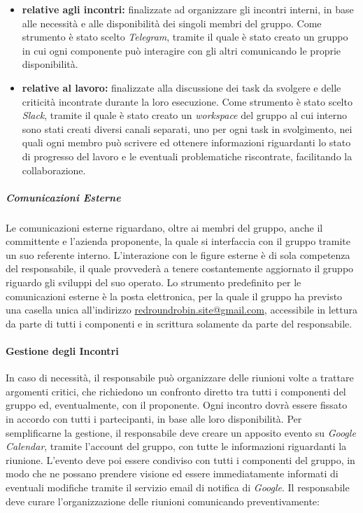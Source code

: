 				\begin{itemize}
					\item \textbf{relative agli incontri:} finalizzate ad organizzare gli incontri interni, in base alle necessità e alle disponibilità dei singoli membri del gruppo.
					\newline
					Come strumento è stato scelto \textit{Telegram}, tramite il quale è stato creato un gruppo in cui ogni componente può interagire con gli altri comunicando le proprie disponibilità.
					\item \textbf{relative al lavoro:} finalizzate alla discussione dei task da svolgere e delle criticità incontrate durante la loro esecuzione.
					\newline
					Come strumento è stato scelto \textit{Slack}, tramite il quale è stato creato un \textit{workspace} del gruppo al cui interno sono stati creati diversi canali separati, uno per ogni task in svolgimento, nei quali ogni membro può scrivere ed ottenere informazioni riguardanti lo stato di progresso del lavoro e le eventuali problematiche riscontrate, facilitando la collaborazione. 
				\end{itemize}
			
			\subparagraph{Comunicazioni Esterne}
			
				Le comunicazioni esterne riguardano, oltre ai membri del gruppo, anche il committente e l'azienda proponente, la quale si interfaccia con il gruppo tramite un suo referente interno. L'interazione con le figure esterne è di sola competenza del responsabile, il quale provvederà a tenere costantemente aggiornato il gruppo riguardo gli sviluppi del suo operato.
				\newline
				Lo strumento predefinito per le comunicazioni esterne è la posta elettronica, per la quale il gruppo ha previsto una casella unica all'indirizzo \href{mailto:redroundrobin.site@gmail.com}{redroundrobin.site@gmail.com}, accessibile in lettura da parte di tutti i componenti e in scrittura solamente da parte del responsabile.
						
		\paragraph{Gestione degli Incontri}
		
			In caso di necessità, il responsabile può organizzare delle riunioni volte a trattare argomenti critici, che richiedono un confronto diretto tra tutti i componenti del gruppo ed, eventualmente, con il proponente.
			\newline
			Ogni incontro dovrà essere fissato in accordo con tutti i partecipanti, in base alle loro disponibilità. Per semplificarne la gestione, il responsabile deve creare un apposito evento su \textit{Google Calendar}, tramite l'account del gruppo, con tutte le informazioni riguardanti la riunione. L'evento deve poi essere condiviso con tutti i componenti del gruppo, in modo che ne possano prendere visione ed essere immediatamente informati di eventuali modifiche tramite il servizio email di notifica di \textit{Google}.
			\newline
			Il responsabile deve curare l'organizzazione delle riunioni comunicando preventivamente:
			
